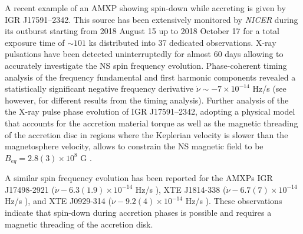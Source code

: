 \documentclass[graybox]{svmult}
\def \nicer{{\em NICER\xspace}}
\begin{document}
A recent example of an AMXP showing spin-down while accreting is given by IGR J17591--2342. This source has been extensively monitored by \nicer{} during its outburst starting from 2018 August 15 up to 2018 October 17 for a total exposure time of  $\sim101$ ks distributed into 37 dedicated observations. X-ray pulsations have been detected uninterruptedly for almost 60 days allowing to accurately investigate the NS spin frequency evolution. Phase-coherent timing analysis of the frequency fundamental and first harmonic components revealed a statistically significant negative frequency derivative $\dot{\nu}\sim -7\times 10^{-14}$ Hz/s \cite{Sanna2020c} (see however, \cite{Kuiper2020} for different results from the timing analysis). Further analysis of the the X-ray pulse phase evolution of IGR J17591--2342, adopting a physical model that accounts for the accretion material torque as well as the magnetic threading of the accretion disc in regions where the Keplerian velocity is slower than the magnetosphere velocity, allows to constrain the NS magnetic field to be $B_{eq} = 2.8(3)\times10^8$ G \cite{Sanna2020c}.

A similar spin frequency evolution has been reported for the AMXPs IGR J17498-2921 ($\dot{\nu} -6.3(1.9)\times 10^{-14}$ Hz/s \cite{Papitto2011b}), XTE J1814-338 ($\dot{\nu} -6.7(7)\times 10^{-14}$ Hz/s \cite{Papitto2007}), and XTE J0929-314 ($\dot{\nu} -9.2(4)\times 10^{-14}$ Hz/s \cite{Galloway2002}). %
These observations indicate that spin-down during accretion phases is possible and requires a magnetic threading of the accretion disk.  
\end{document}
